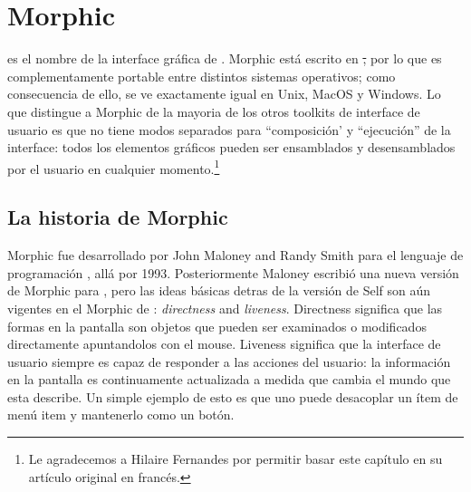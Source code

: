 \documentclass[a4paper,10pt,twoside]{book}
\begin{document}
	\sloppy
\fi
\chapter{Morphic}


 es el nombre de la interface gr\'afica de \pharo.
Morphic est\'a escrito en \st, por lo que es complementamente portable entre distintos sistemas operativos; como consecuencia de ello, \pharo se ve exactamente igual en Unix, MacOS y Windows.
Lo que distingue a Morphic de la mayoria de los otros toolkits de interface de usuario es que no tiene modos separados para  ``composici\'on' y ``ejecuci\'on'' de la interface: todos los elementos gráficos pueden ser ensamblados y desensamblados por el usuario en cualquier momento.\footnote{Le agradecemos a Hilaire Fernandes por permitir basar este cap\'itulo en su art\'iculo original en franc\'es.}



\section{La historia de Morphic}

Morphic fue desarrollado por John Maloney and Randy Smith para el lenguaje de programaci\'on  , all\'a por 1993. 
Posteriormente Maloney escribi\'o una nueva versi\'on de Morphic para \squeak, pero las ideas b\'asicas detras de la versi\'on de Self son a\'un vigentes en el Morphic de \pharo: \emph{directness} and \emph{liveness}.
Directness significa que las formas en la pantalla son objetos que pueden ser examinados o modificados directamente apuntandolos con el mouse.
Liveness significa que la interface de usuario siempre es capaz de responder a las acciones del usuario: la informaci\'on en la pantalla es continuamente actualizada a medida que cambia el mundo que esta describe.
Un simple ejemplo de esto es que uno puede desacoplar un ítem de men\'u item y mantenerlo como un bot\'on.
\end{document}
